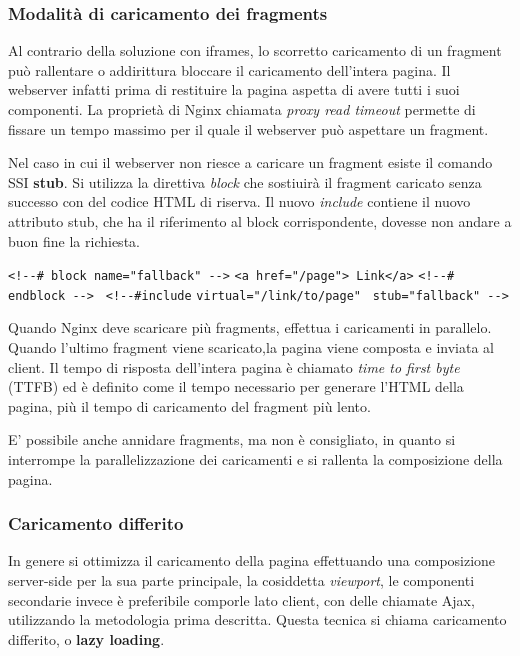 \subsubsection{Modalità di caricamento dei fragments}
Al contrario della soluzione con iframes, lo scorretto caricamento di un fragment può rallentare o addirittura bloccare 
il caricamento dell'intera pagina. Il webserver infatti prima di restituire la pagina aspetta di avere tutti  i suoi componenti.
La proprietà di Nginx chiamata \emph{proxy read timeout} permette di fissare un tempo massimo per il quale il webserver 
può aspettare un fragment.

Nel caso in cui il webserver non riesce a caricare un fragment esiste il comando SSI \textbf{stub}.
Si utilizza la direttiva \emph{block} che sostiuirà il fragment caricato senza successo con del codice HTML di riserva.
Il nuovo \emph{include} contiene il nuovo attributo stub, che ha il riferimento al block corrispondente, dovesse non andare
a buon fine la richiesta.


\verb|<!--# block name="fallback" -->|\linebreak
\verb|<a href="/page"> Link</a>|\linebreak
\verb|<!--# endblock -->|\linebreak
\verb| <!--#include|\linebreak
\verb|virtual="/link/to/page"|\linebreak
\verb| stub="fallback" -->|\linebreak


Quando Nginx deve scaricare più fragments, effettua i caricamenti in parallelo.
Quando l'ultimo fragment viene scaricato,la pagina viene composta e inviata al client.
Il tempo di risposta dell'intera pagina è chiamato \emph{time to first byte} (TTFB) ed è definito 
come il tempo necessario per generare l’HTML della pagina, più il tempo di caricamento del fragment più lento.

E' possibile anche annidare fragments, ma non è consigliato, in quanto si 
interrompe la parallelizzazione dei caricamenti e si rallenta la composizione della pagina.

\subsubsection{Caricamento differito}
In genere si ottimizza il caricamento della pagina effettuando una composizione server-side per la sua parte principale,
 la cosiddetta \emph{viewport}, le componenti secondarie invece è preferibile comporle lato client, con 
delle chiamate Ajax, utilizzando la metodologia prima descritta. Questa tecnica si chiama caricamento differito, o \textbf{lazy loading}.

